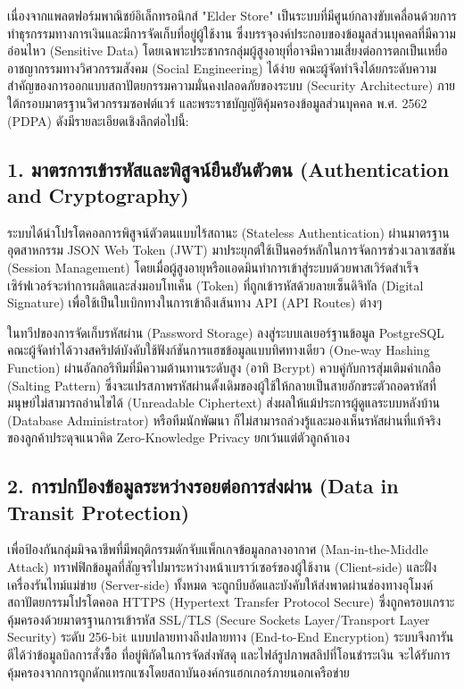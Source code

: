 เนื่องจากแพลตฟอร์มพาณิชย์อิเล็กทรอนิกส์ "Elder Store" เป็นระบบที่มีศูนย์กลางขับเคลื่อนด้วยการทำธุรกรรมทางการเงินและมีการจัดเก็บที่อยู่ผู้ใช้งาน ซึ่งบรรจุองค์ประกอบของข้อมูลส่วนบุคคลที่มีความอ่อนไหว (Sensitive Data) โดยเฉพาะประชากรกลุ่มผู้สูงอายุที่อาจมีความเสี่ยงต่อการตกเป็นเหยื่ออาชญากรรมทางวิศวกรรมสังคม (Social Engineering) ได้ง่าย คณะผู้จัดทำจึงได้ยกระดับความสำคัญของการออกแบบสถาปัตยกรรมความมั่นคงปลอดภัยของระบบ (Security Architecture) ภายใต้กรอบมาตรฐานวิศวกรรมซอฟต์แวร์ และพระราชบัญญัติคุ้มครองข้อมูลส่วนบุคคล พ.ศ. 2562 (PDPA) ดังมีรายละเอียดเชิงลึกต่อไปนี้:

\subsection{1. มาตรการเข้ารหัสและพิสูจน์ยืนยันตัวตน (Authentication and Cryptography)}
ระบบได้นำโปรโตคอลการพิสูจน์ตัวตนแบบไร้สถานะ (Stateless Authentication) ผ่านมาตรฐานอุตสาหกรรม JSON Web Token (JWT) มาประยุกต์ใช้เป็นคอร์หลักในการจัดการช่วงเวลาเซสชัน (Session Management) โดยเมื่อผู้สูงอายุหรือแอดมินทำการเข้าสู่ระบบด้วยพาสเวิร์ดสำเร็จ เซิร์ฟเวอร์จะทำการผลิตและส่งมอบโทเค็น (Token) ที่ถูกเข้ารหัสด้วยลายเซ็นดิจิทัล (Digital Signature) เพื่อใช้เป็นใบเบิกทางในการเข้าถึงเส้นทาง API (API Routes) ต่างๆ 

ในทวีปของการจัดเก็บรหัสผ่าน (Password Storage) ลงสู่ระบบเลเยอร์ฐานข้อมูล PostgreSQL คณะผู้จัดทำได้วางสคริปต์บังคับใช้ฟังก์ชันการแฮชข้อมูลแบบทิศทางเดียว (One-way Hashing Function) ผ่านอัลกอริทึมที่มีความต้านทานระดับสูง (อาทิ Bcrypt) ควบคู่กับการสุ่มเติมค่าเกลือ (Salting Pattern) ซึ่งจะแปรสภาพรหัสผ่านดั้งเดิมของผู้ใช้ให้กลายเป็นสายอักขระตัวถอดรหัสที่มนุษย์ไม่สามารถอ่านไขได้ (Unreadable Ciphertext) ส่งผลให้แม้ประการผู้ดูแลระบบหลังบ้าน (Database Administrator) หรือทีมนักพัฒนา ก็ไม่สามารถล่วงรู้และมองเห็นรหัสผ่านที่แท้จริงของลูกค้าประดุจแนวคิด Zero-Knowledge Privacy ยกเว้นแต่ตัวลูกค้าเอง

\subsection{2. การปกป้องข้อมูลระหว่างรอยต่อการส่งผ่าน (Data in Transit Protection)}
เพื่อป้องกันกลุ่มมิจฉาชีพที่มีพฤติกรรมดักจับแพ็กเกจข้อมูลกลางอากาศ (Man-in-the-Middle Attack) ทราฟฟิกข้อมูลที่สัญจรไปมาระหว่างหน้าเบราว์เซอร์ของผู้ใช้งาน (Client-side) และฝั่งเครื่องรันไทม์แม่ข่าย (Server-side) ทั้งหมด จะถูกบีบอัดและบังคับให้ส่งพาดผ่านช่องทางอุโมงค์สถาปัตยกรรมโปรโตคอล HTTPS (Hypertext Transfer Protocol Secure) ซึ่งถูกครอบเกราะคุ้มครองด้วยมาตรฐานการเข้ารหัส SSL/TLS (Secure Sockets Layer/Transport Layer Security) ระดับ 256-bit แบบปลายทางถึงปลายทาง (End-to-End Encryption) ระบบจึงการันตีได้ว่าข้อมูลบิลการสั่งซื้อ ที่อยู่พิกัดในการจัดส่งพัสดุ และไฟล์รูปภาพสลิปที่โอนชำระเงิน จะได้รับการคุ้มครองจากการถูกดักแทรกแซงโดยสถาบันองค์กรแฮกเกอร์ภายนอกเครือข่าย

